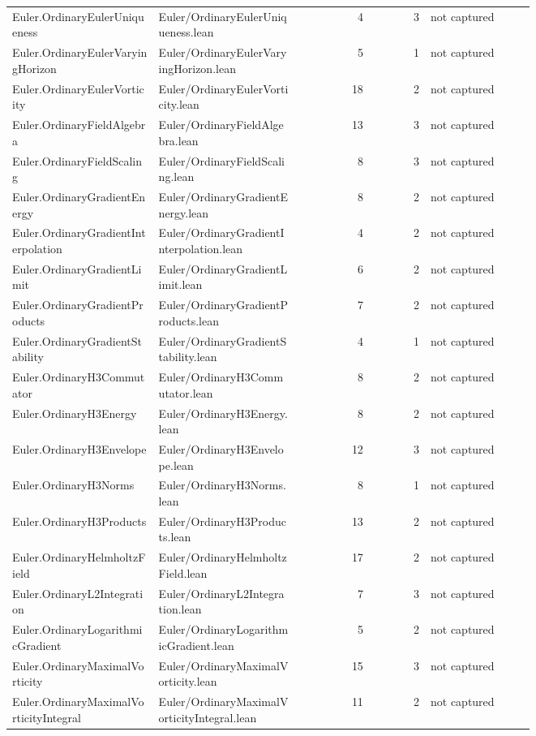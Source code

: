 \documentclass[10pt]{article}
\begin{document}
\begin{longtable}{p{0.28\linewidth}p{0.27\linewidth}r r p{0.20\linewidth}}
Euler.OrdinaryEulerUniqueness & Euler/OrdinaryEulerUniqueness.lean & 4 & 3 & not captured\\
Euler.OrdinaryEulerVaryingHorizon & Euler/OrdinaryEulerVaryingHorizon.lean & 5 & 1 & not captured\\
Euler.OrdinaryEulerVorticity & Euler/OrdinaryEulerVorticity.lean & 18 & 2 & not captured\\
Euler.OrdinaryFieldAlgebra & Euler/OrdinaryFieldAlgebra.lean & 13 & 3 & not captured\\
Euler.OrdinaryFieldScaling & Euler/OrdinaryFieldScaling.lean & 8 & 3 & not captured\\
Euler.OrdinaryGradientEnergy & Euler/OrdinaryGradientEnergy.lean & 8 & 2 & not captured\\
Euler.OrdinaryGradientInterpolation & Euler/OrdinaryGradientInterpolation.lean & 4 & 2 & not captured\\
Euler.OrdinaryGradientLimit & Euler/OrdinaryGradientLimit.lean & 6 & 2 & not captured\\
Euler.OrdinaryGradientProducts & Euler/OrdinaryGradientProducts.lean & 7 & 2 & not captured\\
Euler.OrdinaryGradientStability & Euler/OrdinaryGradientStability.lean & 4 & 1 & not captured\\
Euler.OrdinaryH3Commutator & Euler/OrdinaryH3Commutator.lean & 8 & 2 & not captured\\
Euler.OrdinaryH3Energy & Euler/OrdinaryH3Energy.lean & 8 & 2 & not captured\\
Euler.OrdinaryH3Envelope & Euler/OrdinaryH3Envelope.lean & 12 & 3 & not captured\\
Euler.OrdinaryH3Norms & Euler/OrdinaryH3Norms.lean & 8 & 1 & not captured\\
Euler.OrdinaryH3Products & Euler/OrdinaryH3Products.lean & 13 & 2 & not captured\\
Euler.OrdinaryHelmholtzField & Euler/OrdinaryHelmholtzField.lean & 17 & 2 & not captured\\
Euler.OrdinaryL2Integration & Euler/OrdinaryL2Integration.lean & 7 & 3 & not captured\\
Euler.OrdinaryLogarithmicGradient & Euler/OrdinaryLogarithmicGradient.lean & 5 & 2 & not captured\\
Euler.OrdinaryMaximalVorticity & Euler/OrdinaryMaximalVorticity.lean & 15 & 3 & not captured\\
Euler.OrdinaryMaximalVorticityIntegral & Euler/OrdinaryMaximalVorticityIntegral.lean & 11 & 2 & not captured\\

\end{longtable}
\end{document}
